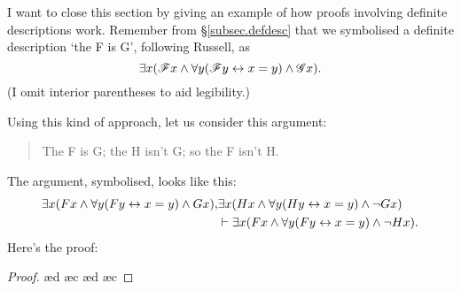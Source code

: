 I want to close this section by giving an example of how proofs involving definite descriptions work. Remember from §\ref{subsec.defdesc} that we symbolised a definite description `the F is G', following Russell, as $$\exists x (\mathscr{F}x  \wedge \forall y(\mathscr{F}y \leftrightarrow x=y) \wedge \mathscr{G}x).$$ (I omit interior parentheses to aid legibility.) 

Using this kind of approach, let us consider this argument: \begin{quote}
	The F is G; the H isn't G; so the F isn't H.
\end{quote} The argument, symbolised, looks like this: 
\begin{align*}
	\exists x (Fx  \wedge \forall y(Fy \leftrightarrow x=y)\wedge Gx),& \exists x (Hx \wedge \forall y(Hy \leftrightarrow x=y) \wedge \neg Gx) \\ &\vdash \exists x (Fx \wedge \forall y(Fy \leftrightarrow x=y)\wedge \neg Hx).
\end{align*} Here's the proof: \begin{proof}
	\open
	\open
	\open
	\ae{d}
	\ae{c}
	\ae{d}
	\close
	\close
	\ae{c}
	\close

\end{proof}

